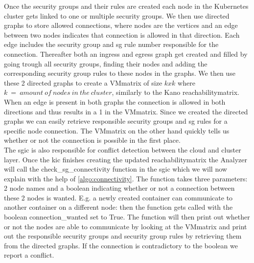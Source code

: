 Once the security groups and their rules are created each node in the Kubernetes cluster gets linked to one or multiple security groups. We then use directed graphs to store allowed connections, where nodes are the vertices and an edge between two nodes indicates that connection is allowed in that direction. Each edge includes the security group and \acrshort{sg} rule number responsible for the connection. Thereafter both an ingress and egress graph get created and filled by going trough all security groups, finding their nodes and adding the corresponding security group rules to these nodes in the graphs. We then use these 2 directed graphs to create a VMmatrix of size \(kxk\) where \(k\ =\ amount\  of\  nodes\  in\  the\  cluster\), similarly to the Kano reachabilitymatrix. When an edge is present in both graphs the connection is allowed in both directions and thus results in a 1 in the VMmatrix. Since we created the directed graphs we can easily retrieve responsible security groups and \acrshort{sg} rules for a specific node connection. The VMmatrix on the other hand quickly tells us whether or not the connection is possible in the first place.
\\[10pt]

The \acrlong{sgic} is also responsible for conflict detection between the cloud and cluster layer. Once the \acrshort{kic} finishes creating the updated reachabilitymatrix the Analyzer will call the check\_sg\_connectivity function in the \acrshort{sgic} which we will now explain with the help of \autoref{algo:connectivity}. The function takes three parameters: 2 node names and a boolean indicating whether or not a connection between these 2 nodes is wanted. E.g. a newly created container can communicate to another container on a different node: then the function gets called with the boolean connection\_wanted set to True. The function will then print out whether or not the nodes are able to communicate by looking at the VMmatrix and print out the responsible security groups and security group rules by retrieving them from the directed graphs. If the connection is contradictory to the boolean we report a conflict.





\cleardoublepage


